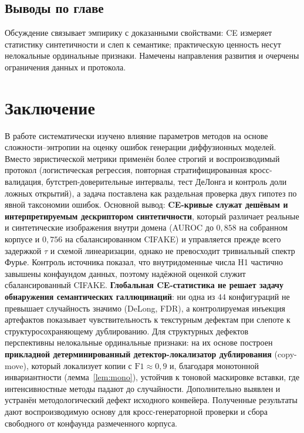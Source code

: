 \documentclass[14pt]{extarticle}
\theoremstyle{plain}
\numberwithin{equation}{section}
\numberwithin{figure}{section}
\numberwithin{table}{section}
\begin{document}
\subsection*{Выводы по главе}
Обсуждение связывает эмпирику с доказанными свойствами: CE измеряет статистику
синтетичности и слеп к семантике; практическую ценность несут нелокальные
ординальные признаки. Намечены направления развития и очерчены ограничения данных
и протокола.

\section{Заключение}\label{sec:conclusions}

В работе систематически изучено влияние параметров методов на основе
сложности–энтропии на оценку ошибок генерации диффузионных моделей. Вместо
эвристической метрики применён более строгий и воспроизводимый протокол
(логистическая регрессия, повторная стратифицированная кросс-валидация,
бутстреп-доверительные интервалы, тест ДеЛонга и контроль доли ложных открытий), а
задача поставлена как раздельная проверка двух гипотез по явной таксономии ошибок.
Основной вывод: \textbf{CE-кривые служат дешёвым и интерпретируемым дескриптором
синтетичности}, который различает реальные и синтетические изображения внутри
домена (AUROC до $0{,}858$ на собранном корпусе и $0{,}756$ на сбалансированном
CIFAKE) и управляется прежде всего задержкой $\tau$ и схемой линеаризации, однако
не превосходит тривиальный спектр Фурье. Контроль источника показал, что
внутридоменные числа H1 частично завышены конфаундом данных, поэтому надёжной
оценкой служит сбалансированный CIFAKE. \textbf{Глобальная CE-статистика не решает
задачу обнаружения семантических галлюцинаций}: ни одна из $44$ конфигураций не
превышает случайность значимо (DeLong, FDR), а контролируемая инъекция артефактов
показывает чувствительность к текстурным дефектам при слепоте к
структуросохраняющему дублированию. Для структурных дефектов перспективны
нелокальные ординальные признаки: на их основе построен \textbf{прикладной
детерминированный детектор-локализатор дублирования} (copy-move), который
локализует копии с $\mathrm{F1}\approx0{,}9$ и, благодаря монотонной инвариантности
(лемма~\ref{lem:mono}), устойчив к тоновой маскировке вставки, где интенсивностные
методы падают до случайности. Дополнительно выявлен и устранён методологический
дефект исходного конвейера. Полученные результаты дают воспроизводимую основу для
кросс-генераторной проверки и сбора свободного от конфаунда размеченного корпуса.
\end{document}
